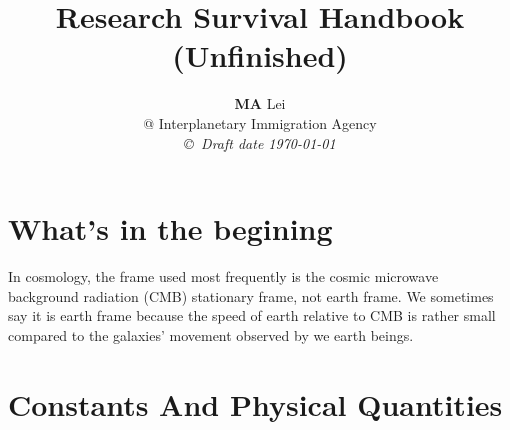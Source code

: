 \documentclass[12pt,a4paper]{book}
\begin{document}
\title{Research Survival Handbook \\ (\textbf{Unfinished})}
\author{{\bf MA} Lei  \\
@ Interplanetary Immigration Agency \\
{\small\em \copyright \ Draft date \today}}
\date{}
\maketitle


\newcommand{\dd}{\mathrm d}
\newenvironment{eqnset}
{\begin{equation}\left \bracevert \begin{array}{l}}
{\end{array} \right. \end{equation}}

\newenvironment{eqn}
{\begin{equation}\left \bracevert \begin{array}{l}}
{\end{array} \right. \end{equation}}





























\section{What's in the begining}

In cosmology, the frame used most frequently is the cosmic microwave background radiation (CMB) stationary frame,  not earth frame. We sometimes say it is earth frame because the speed of earth relative to CMB is rather small compared to the galaxies' movement observed by we earth beings.



\section{Constants And Physical Quantities}
\end{document}
